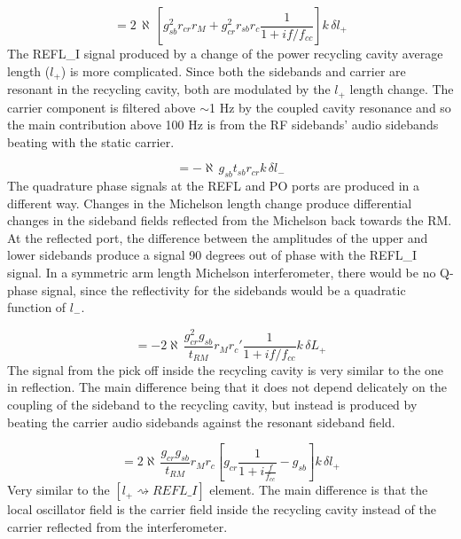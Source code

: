 \begin{equation}
[ l_{+} \rightsquigarrow  REFL\_I ] = 2 \, \aleph \, \left [ g_{sb}^{2} r_{cr} r_{M}  
                            + g_{cr}^{2} r_{sb} r_{c} 
                            \frac{1}{1 + i f / f_{cc}} \right ]
                            k \, \delta l_{+}
\label{eq:prc2refli}
\end{equation}
The REFL\_I signal produced by a change of the power recycling cavity average length 
($l_{+}$) is more complicated. Since both the sidebands and carrier are resonant in 
the recycling cavity, both are modulated by the $l_+$ length change. The carrier 
component is filtered above $\sim$1 Hz by the coupled cavity resonance and so the main 
contribution above 100 Hz is from the RF sidebands' audio sidebands beating 
with the static carrier.


\begin{equation}
[l_{-} \rightsquigarrow  REFL\_Q ] = - \aleph \, g_{sb} t_{sb} r_{cr} k \, \delta l_{-}
\label{eq:mich2reflq}
\end{equation}
The quadrature phase signals at the REFL and PO ports are produced in a
different way. Changes in the Michelson length change produce differential changes
in the sideband fields reflected from the Michelson back towards the RM. At the
reflected port, the difference between the amplitudes of the upper and lower
sidebands produce a signal 90 degrees out of phase with the REFL\_I signal. In
a symmetric arm length Michelson interferometer, there would be no Q-phase
signal, since the reflectivity for the sidebands would be a quadratic
function of $l_{-}$.



\begin{equation}
[ L_{+} \rightsquigarrow  POB\_I ] = -2 \aleph \, \frac{g_{cr}^{2} g_{sb}}{t_{RM}} r_{M} r_{c}'  
                  \frac{1}{1 + i f / f_{cc}} k \, \delta L_{+}
\label{eq:carm2pobi}
\end{equation}
The signal from the pick off inside the recycling cavity is very similar to the
one in reflection. The main difference being that it does not depend delicately
on the coupling of the sideband to the recycling cavity, but instead is produced
by beating the carrier audio sidebands against the resonant sideband field.


\begin{equation}
[ l_{+} \rightsquigarrow  POB\_I ] = 2 \aleph \, \frac{g_{cr} g_{sb}}{t_{RM}} r_{M} r_{c}  
                  \left[g_{cr} \frac{1}{1+i\frac{f}{f_{cc}}} -g_{sb}\right]
                  k \, \delta l_{+}
\label{eq:prc2pobi}
\end{equation}
Very similar to the $[l_{+} \rightsquigarrow REFL\_I]$ element. The main difference
is that the local oscillator field is the carrier field inside the recycling cavity
instead of the carrier reflected from the interferometer.

